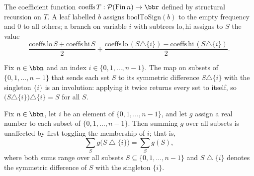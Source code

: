 \begin{definition}
\label{DecisionTree.coeffs}
\leanok
{}
The coefficient function $\mathrm{coeffs}\,T : \mathcal{P}(\mathrm{Fin}\,n) \to \bbr$
defined by structural recursion on $T$. A leaf labelled $b$ assigns
$\mathrm{boolToSign}(b)$ to the empty frequency and $0$ to all others; a branch on
variable $i$ with subtrees $\mathrm{lo}, \mathrm{hi}$ assigns to $S$ the value
\[
\frac{\mathrm{coeffs}\,\mathrm{lo}\,S + \mathrm{coeffs}\,\mathrm{hi}\,S}{2}
+ \frac{\mathrm{coeffs}\,\mathrm{lo}\,(S \triangle \{i\})
      - \mathrm{coeffs}\,\mathrm{hi}\,(S \triangle \{i\})}{2}.
\]
\end{definition}

\begin{lemma}
\label{DecisionTree.symmDiff_singleton_invol}
\leanok
{}
Fix $n \in \bbn$ and an index $i \in \{0, 1, \dots, n-1\}$. The map on subsets of $\{0,
1, \dots, n-1\}$ that sends each set $S$ to its symmetric difference $S \triangle \{i\}$
with the singleton $\{i\}$ is an involution: applying it twice returns every set to
itself, so $\bigl(S \triangle \{i\}\bigr) \triangle \{i\} = S$ for all $S$.
\end{lemma}

\begin{lemma}
\label{DecisionTree.sum_symmDiff_reindex}
\leanok
{}
Fix $n \in \bbn$, let $i$ be an element of $\{0, 1, \dots, n-1\}$, and let $g$ assign a
real number to each subset of $\{0, 1, \dots, n-1\}$. Then summing $g$ over all subsets
is unaffected by first toggling the membership of $i$; that is,
\[
\sum_{S} g\big(S \mathbin{\triangle} \{i\}\big) = \sum_{S} g(S),
\]
where both sums range over all subsets $S \subseteq \{0, 1, \dots, n-1\}$ and $S
\mathbin{\triangle} \{i\}$ denotes the symmetric difference of $S$ with the singleton
$\{i\}$.
\end{lemma}

